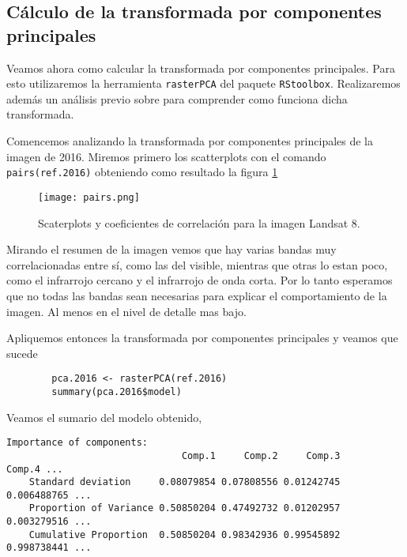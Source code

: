 \subsection{C\'alculo de la transformada por componentes principales}

Veamos ahora como calcular la transformada por componentes principales. Para
esto utilizaremos la herramienta \texttt{rasterPCA} del paquete
\texttt{RStoolbox}. Realizaremos adem\'as un an\'alisis previo sobre para comprender
como funciona dicha transformada.

\begin{exa}
    Comencemos analizando la transformada por componentes principales de la
    imagen de 2016. Miremos primero los scatterplots con el comando \texttt{pairs(ref.2016)}
    obteniendo como resultado la figura \ref{fig:pairs2}
    \begin{figure}[h!]
    \begin{center}
        \texttt{[image: pairs.png]}
    \end{center}
    \caption{Scaterplots y coeficientes de correlaci\'on para la imagen Landsat 8.}
    \label{fig:pairs2}
    \end{figure}

    Mirando el resumen de la imagen vemos que hay varias bandas muy
    correlacionadas entre s\'i, como las del visible, mientras que otras lo
    estan poco, como el infrarrojo cercano y el infrarrojo de onda corta. Por lo tanto esperamos que no
    todas las bandas sean necesarias para explicar el comportamiento de la
    imagen. Al menos en el nivel de detalle mas bajo.

    Apliquemos entonces la transformada por componentes principales y veamos que
    sucede

    \begin{lstlisting}
        pca.2016 <- rasterPCA(ref.2016)
        summary(pca.2016$model)
    \end{lstlisting}

    Veamos el sumario del modelo obtenido,
    \begin{Verbatim}[fontsize=\small]
    Importance of components:
                               Comp.1     Comp.2     Comp.3      Comp.4 ...
    Standard deviation     0.08079854 0.07808556 0.01242745 0.006488765 ...
    Proportion of Variance 0.50850204 0.47492732 0.01202957 0.003279516 ...
    Cumulative Proportion  0.50850204 0.98342936 0.99545892 0.998738441 ...
    \end{Verbatim}


\end{exa}
